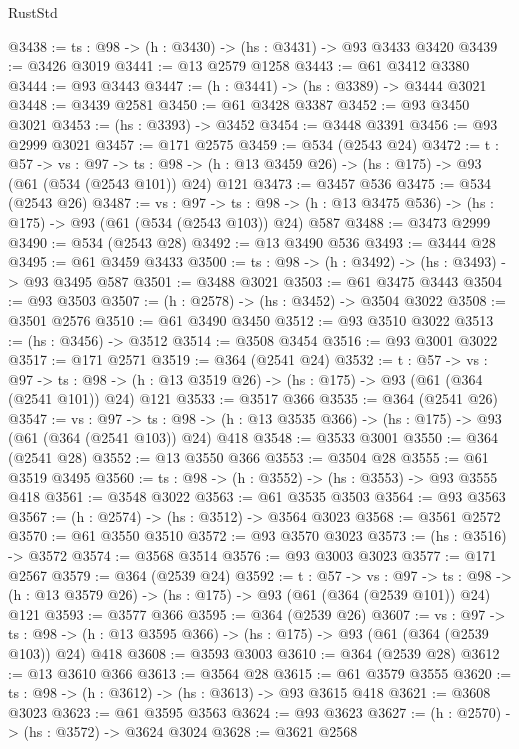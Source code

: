 \begin{lexlean}{RustStd}
\begin{coremodule}
@3438 := {ts : @98} -> (h : @3430) -> (hs : @3431) -> @93 @3433 @3420
@3439 := @3426 @3019
@3441 := @13 @2579 @1258
@3443 := @61 @3412 @3380
@3444 := @93 @3443
@3447 := (h : @3441) -> (hs : @3389) -> @3444 @3021
@3448 := @3439 @2581
@3450 := @61 @3428 @3387
@3452 := @93 @3450 @3021
@3453 := (hs : @3393) -> @3452
@3454 := @3448 @3391
@3456 := @93 @2999 @3021
@3457 := @171 @2575
@3459 := @534 (@2543 @24)
@3472 := {t : @57} ->
  {vs : @97} ->
  {ts : @98} -> (h : @13 @3459 @26) -> (hs : @175) -> @93 (@61 (@534 (@2543 @101)) @24) @121
@3473 := @3457 @536
@3475 := @534 (@2543 @26)
@3487 := {vs : @97} ->
  {ts : @98} -> (h : @13 @3475 @536) -> (hs : @175) -> @93 (@61 (@534 (@2543 @103)) @24) @587
@3488 := @3473 @2999
@3490 := @534 (@2543 @28)
@3492 := @13 @3490 @536
@3493 := @3444 @28
@3495 := @61 @3459 @3433
@3500 := {ts : @98} -> (h : @3492) -> (hs : @3493) -> @93 @3495 @587
@3501 := @3488 @3021
@3503 := @61 @3475 @3443
@3504 := @93 @3503
@3507 := (h : @2578) -> (hs : @3452) -> @3504 @3022
@3508 := @3501 @2576
@3510 := @61 @3490 @3450
@3512 := @93 @3510 @3022
@3513 := (hs : @3456) -> @3512
@3514 := @3508 @3454
@3516 := @93 @3001 @3022
@3517 := @171 @2571
@3519 := @364 (@2541 @24)
@3532 := {t : @57} ->
  {vs : @97} ->
  {ts : @98} -> (h : @13 @3519 @26) -> (hs : @175) -> @93 (@61 (@364 (@2541 @101)) @24) @121
@3533 := @3517 @366
@3535 := @364 (@2541 @26)
@3547 := {vs : @97} ->
  {ts : @98} -> (h : @13 @3535 @366) -> (hs : @175) -> @93 (@61 (@364 (@2541 @103)) @24) @418
@3548 := @3533 @3001
@3550 := @364 (@2541 @28)
@3552 := @13 @3550 @366
@3553 := @3504 @28
@3555 := @61 @3519 @3495
@3560 := {ts : @98} -> (h : @3552) -> (hs : @3553) -> @93 @3555 @418
@3561 := @3548 @3022
@3563 := @61 @3535 @3503
@3564 := @93 @3563
@3567 := (h : @2574) -> (hs : @3512) -> @3564 @3023
@3568 := @3561 @2572
@3570 := @61 @3550 @3510
@3572 := @93 @3570 @3023
@3573 := (hs : @3516) -> @3572
@3574 := @3568 @3514
@3576 := @93 @3003 @3023
@3577 := @171 @2567
@3579 := @364 (@2539 @24)
@3592 := {t : @57} ->
  {vs : @97} ->
  {ts : @98} -> (h : @13 @3579 @26) -> (hs : @175) -> @93 (@61 (@364 (@2539 @101)) @24) @121
@3593 := @3577 @366
@3595 := @364 (@2539 @26)
@3607 := {vs : @97} ->
  {ts : @98} -> (h : @13 @3595 @366) -> (hs : @175) -> @93 (@61 (@364 (@2539 @103)) @24) @418
@3608 := @3593 @3003
@3610 := @364 (@2539 @28)
@3612 := @13 @3610 @366
@3613 := @3564 @28
@3615 := @61 @3579 @3555
@3620 := {ts : @98} -> (h : @3612) -> (hs : @3613) -> @93 @3615 @418
@3621 := @3608 @3023
@3623 := @61 @3595 @3563
@3624 := @93 @3623
@3627 := (h : @2570) -> (hs : @3572) -> @3624 @3024
@3628 := @3621 @2568

\end{coremodule}
\end{lexlean}
